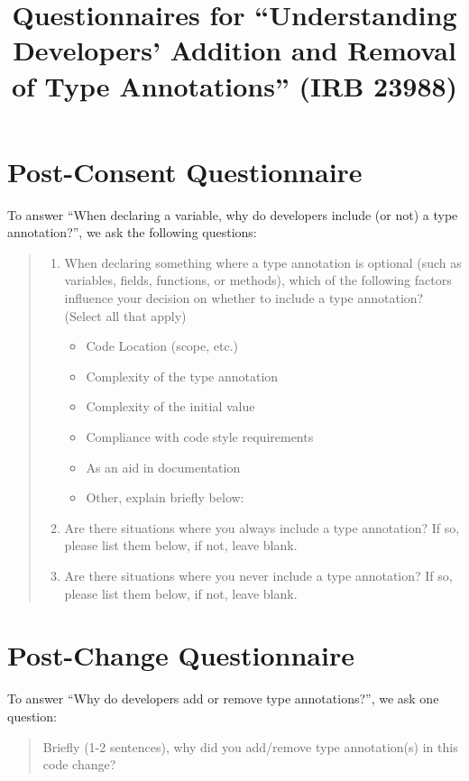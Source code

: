 \documentclass[paper=letter,fontsize=11pt,DIV=14]{scrartcl}
\title{Questionnaires for ``Understanding Developers' Addition and Removal of Type Annotations'' (IRB 23988)}
\author{}
\date{}
\begin{document}
\maketitle

\section*{Post-Consent Questionnaire}

To answer \enquote{When declaring a variable, why do developers include (or not) a type annotation?}, we ask the following questions:

\begin{quote}
  \begin{enumerate}
  \item When declaring something where a type annotation is optional (such as variables, fields, functions, or methods), which of the following factors influence your decision on whether to include a type annotation? (Select all that apply)
    \begin{itemize}[label=$\square$]
    \item Code Location (scope, etc.)
    \item Complexity of the type annotation
    \item Complexity of the initial value
    \item Compliance with code style requirements
    \item As an aid in documentation
    \item Other, explain briefly below:
    \end{itemize}
  \item Are there situations where you always include a type annotation?
    If so, please list them below, if not, leave blank.
  \item Are there situations where you never include a type annotation?
    If so, please list them below, if not, leave blank.
  \end{enumerate}
\end{quote}


\section*{Post-Change Questionnaire}

To answer \enquote{Why do developers add or remove type annotations?}, we ask one question:

\begin{quote}
  Briefly (1-2 sentences), why did you add/remove type annotation(s) in this code change?
\end{quote}
\end{document}
